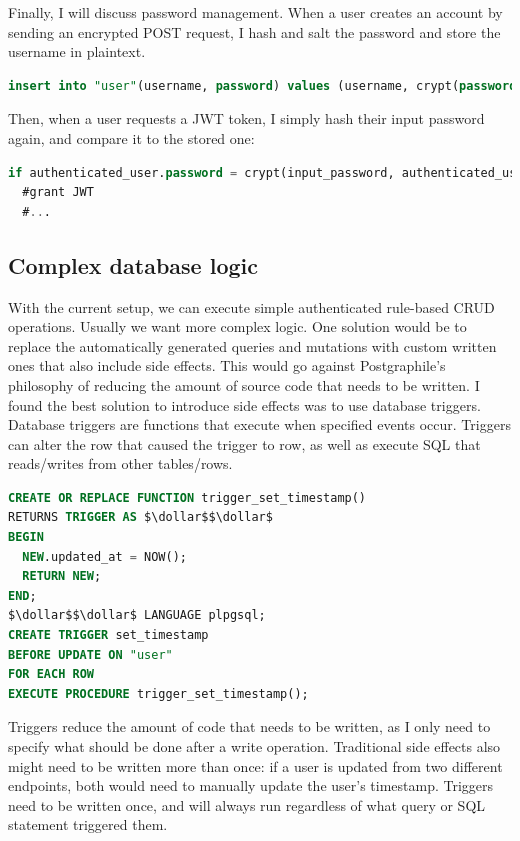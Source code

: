 \documentclass{l4proj}
\begin{document}
Finally, I will discuss password management. When a user creates an account by sending an encrypted POST request, I hash and salt the password and store the username in plaintext.

\begin{lstlisting}[language=SQL, caption={Hashing and salting done with pgcrypto}]
insert into "user"(username, password) values (username, crypt(password, gen_salt('bf')));
\end{lstlisting}

Then, when a user requests a JWT token, I simply hash their input password again, and compare it to the stored one:
\begin{lstlisting}[language=SQL, caption={Hashing and salting done with pgcrypto}]
if authenticated_user.password = crypt(input_password, authenticated_user.password) then
  #grant JWT
  #...
\end{lstlisting}

\subsection{Complex database logic}
With the current setup, we can execute simple authenticated rule-based CRUD operations. Usually we want more complex logic. One solution would be to replace the automatically generated queries and mutations with custom written ones that also include side effects. This would go against Postgraphile's philosophy of reducing the amount of source code that needs to be written. I found the best solution to introduce side effects was to use database triggers. Database triggers are functions that execute when specified events occur. Triggers can alter the row that caused the trigger to row, as well as execute SQL that reads/writes from other tables/rows. 


\begin{lstlisting}[language=SQL, caption={Definition of a trigger function which sets the rows' "updated\_at" column to be the current time, and a trigger which calls the function on a user whenever the user is updated.}]
CREATE OR REPLACE FUNCTION trigger_set_timestamp()
RETURNS TRIGGER AS $\dollar$$\dollar$ 
BEGIN
  NEW.updated_at = NOW();
  RETURN NEW;
END;
$\dollar$$\dollar$ LANGUAGE plpgsql;
CREATE TRIGGER set_timestamp
BEFORE UPDATE ON "user"
FOR EACH ROW
EXECUTE PROCEDURE trigger_set_timestamp();
\end{lstlisting}

Triggers reduce the amount of code that needs to be written, as I only need to specify what should be done after a write operation. Traditional side effects also might need to be written more than once: if a user is updated from two different endpoints, both would need to manually update the user's timestamp. Triggers need to be written once, and will always run regardless of what query or SQL statement triggered them.
\end{document}
